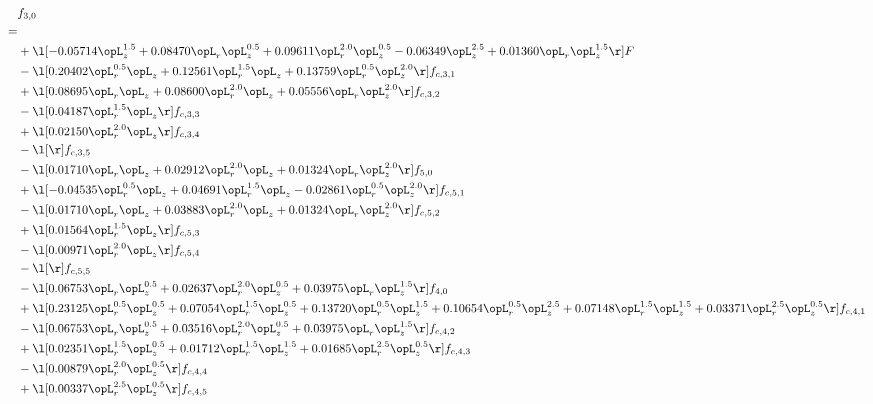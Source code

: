 \begin{alignat}{2} 
\label{eq:f_30_2} 
& f_{3,0} \nonumber \\ 
 = \\ 
& + \l[  -0.05714 \opL_z^{1.5} +  0.08470 \opL_r \opL_z^{0.5} +  0.09611 \opL_r^{2.0} \opL_z^{0.5}   -0.06349 \opL_z^{2.5} +  0.01360 \opL_r \opL_z^{1.5}  \r] F \nonumber \\ 
& - \l[  0.20402 \opL_r^{0.5} \opL_z +  0.12561 \opL_r^{1.5} \opL_z +  0.13759 \opL_r^{0.5} \opL_z^{2.0}  \r] f_{c,3,1} \nonumber \\ 
& + \l[  0.08695 \opL_r \opL_z +  0.08600 \opL_r^{2.0} \opL_z +  0.05556 \opL_r \opL_z^{2.0}  \r] f_{c,3,2} \nonumber \\ 
& - \l[  0.04187 \opL_r^{1.5} \opL_z  \r] f_{c,3,3} \nonumber \\ 
& + \l[  0.02150 \opL_r^{2.0} \opL_z  \r] f_{c,3,4} \nonumber \\ 
& - \l[  \r] f_{c,3,5} \nonumber \\ 
& - \l[  0.01710 \opL_r \opL_z +  0.02912 \opL_r^{2.0} \opL_z +  0.01324 \opL_r \opL_z^{2.0}  \r] f_{5,0} \nonumber \\ 
& + \l[  -0.04535 \opL_r^{0.5} \opL_z +  0.04691 \opL_r^{1.5} \opL_z   -0.02861 \opL_r^{0.5} \opL_z^{2.0}  \r] f_{c,5,1} \nonumber \\ 
& - \l[  0.01710 \opL_r \opL_z +  0.03883 \opL_r^{2.0} \opL_z +  0.01324 \opL_r \opL_z^{2.0}  \r] f_{c,5,2} \nonumber \\ 
& + \l[  0.01564 \opL_r^{1.5} \opL_z  \r] f_{c,5,3} \nonumber \\ 
& - \l[  0.00971 \opL_r^{2.0} \opL_z  \r] f_{c,5,4} \nonumber \\ 
& - \l[  \r] f_{c,5,5} \nonumber \\ 
& - \l[  0.06753 \opL_r \opL_z^{0.5} +  0.02637 \opL_r^{2.0} \opL_z^{0.5} +  0.03975 \opL_r \opL_z^{1.5}  \r] f_{4,0} \nonumber \\ 
& + \l[  0.23125 \opL_r^{0.5} \opL_z^{0.5} +  0.07054 \opL_r^{1.5} \opL_z^{0.5} +  0.13720 \opL_r^{0.5} \opL_z^{1.5} +  0.10654 \opL_r^{0.5} \opL_z^{2.5} +  0.07148 \opL_r^{1.5} \opL_z^{1.5} +  0.03371 \opL_r^{2.5} \opL_z^{0.5}  \r] f_{c,4,1} \nonumber \\ 
& - \l[  0.06753 \opL_r \opL_z^{0.5} +  0.03516 \opL_r^{2.0} \opL_z^{0.5} +  0.03975 \opL_r \opL_z^{1.5}  \r] f_{c,4,2} \nonumber \\ 
& + \l[  0.02351 \opL_r^{1.5} \opL_z^{0.5} +  0.01712 \opL_r^{1.5} \opL_z^{1.5} +  0.01685 \opL_r^{2.5} \opL_z^{0.5}  \r] f_{c,4,3} \nonumber \\ 
& - \l[  0.00879 \opL_r^{2.0} \opL_z^{0.5}  \r] f_{c,4,4} \nonumber \\ 
& + \l[  0.00337 \opL_r^{2.5} \opL_z^{0.5}  \r] f_{c,4,5} \nonumber \\ 
\end{alignat} 


